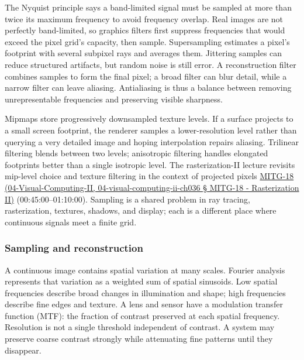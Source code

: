 The Nyquist principle says a band-limited signal must be sampled at more than twice its maximum frequency to avoid frequency overlap. Real images are not perfectly band-limited, so graphics filters first suppress frequencies that would exceed the pixel grid's capacity, then sample. Supersampling estimates a pixel's footprint with several subpixel rays and averages them. Jittering samples can reduce structured artifacts, but random noise is still error. A reconstruction filter combines samples to form the final pixel; a broad filter can blur detail, while a narrow filter can leave aliasing. Antialiasing is thus a balance between removing unrepresentable frequencies and preserving visible sharpness.

Mipmaps store progressively downsampled texture levels. If a surface projects to a small screen footprint, the renderer samples a lower-resolution level rather than querying a very detailed image and hoping interpolation repairs aliasing. Trilinear filtering blends between two levels; anisotropic filtering handles elongated footprints better than a single isotropic level. The rasterization-II lecture revisits mip-level choice and texture filtering in the context of projected pixels \href{}{MITG-18 (04-Visual-Computing-II, 04-visual-computing-ii-ch036 § MITG-18 - Rasterization II)} (00:45:00--01:10:00). Sampling is a shared problem in ray tracing, rasterization, textures, shadows, and display; each is a different place where continuous signals meet a finite grid.

\subsubsection{Sampling and reconstruction}\label{sampling-and-reconstruction}

A continuous image contains spatial variation at many scales. Fourier analysis represents that variation as a weighted sum of spatial sinusoids. Low spatial frequencies describe broad changes in illumination and shape; high frequencies describe fine edges and texture. A lens and sensor have a modulation transfer function (MTF): the fraction of contrast preserved at each spatial frequency. Resolution is not a single threshold independent of contrast. A system may preserve coarse contrast strongly while attenuating fine patterns until they disappear.

